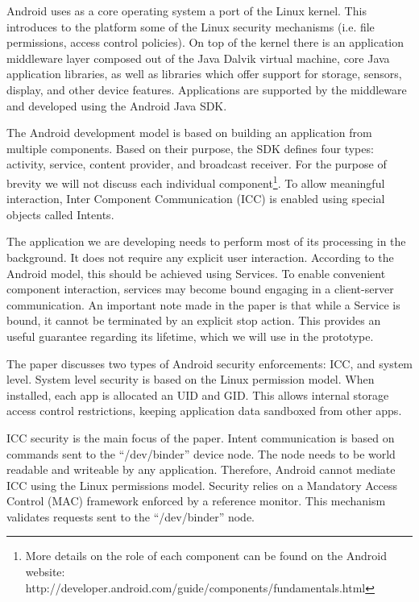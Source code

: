 Android uses as a core operating system a port of the Linux kernel. This introduces to the platform some of the Linux security mechanisms (i.e. file permissions, access control policies). On top of the kernel there is an application middleware layer composed out of the Java Dalvik virtual machine, core Java application libraries, as well as libraries which offer support for storage, sensors, display, and other device features. Applications are supported by the middleware and developed using the Android Java SDK.

The Android development model is based on building an application from multiple components. Based on their purpose, the SDK defines four types: activity, service, content provider, and broadcast receiver. For the purpose of brevity we will not discuss each individual component\footnote{More details on the role of each component can be found on the Android website: http://developer.android.com/guide/components/fundamentals.html}. To allow meaningful interaction, Inter Component Communication (ICC) is enabled using special objects called Intents.

The application we are developing needs to perform most of its processing in the background. It does not require any explicit user interaction. According to the Android model, this should be achieved using Services. To enable convenient component interaction, services may become bound engaging in a client-server communication. An important note made in the paper is that while a Service is bound, it cannot be terminated by an explicit stop action. This provides an useful guarantee regarding its lifetime, which we will use in the prototype.

The paper discusses two types of Android security enforcements: ICC, and system level. System level security is based on the Linux permission model. When installed, each app is allocated an UID and GID. This allows internal storage access control restrictions, keeping application data sandboxed from other apps.

ICC security is the main focus of the paper. Intent communication is based on commands sent to the ``/dev/binder'' device node. The node needs to be world readable and writeable by any application. Therefore, Android cannot mediate ICC using the Linux permissions model. Security relies on a Mandatory Access Control (MAC) framework enforced by a reference monitor. This mechanism validates requests sent to the ``/dev/binder'' node. 

